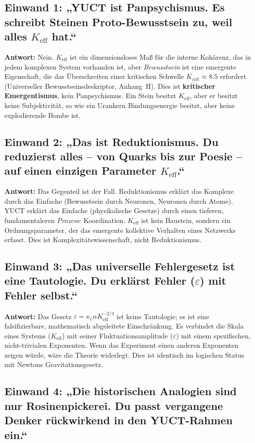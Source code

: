 \documentclass[12pt,a4paper]{article}
\newcommand{\Keff}{K_{\mathrm{eff}}}
\begin{document}
\subsection*{Einwand 1: „YUCT ist Panpsychismus. Es schreibt Steinen Proto-Bewusstsein zu, weil alles \(\Keff\) hat.“}

\textbf{Antwort:} Nein. \(\Keff\) ist ein dimensionsloses Maß für die interne Kohärenz, das in jedem komplexen System vorhanden ist, aber \emph{Bewusstsein} ist eine emergente Eigenschaft, die das Überschreiten einer kritischen Schwelle \(K_{\mathrm{crit}} \approx 8.5\) erfordert (Universeller Bewusstseinsdeskriptor, Anhang~H). Dies ist \textbf{kritischer Emergentismus}, kein Panpsychismus. Ein Stein besitzt \(\Keff\), aber er besitzt keine Subjektivität, so wie ein Urankern Bindungsenergie besitzt, aber keine explodierende Bombe ist.

\subsection*{Einwand 2: „Das ist Reduktionismus. Du reduzierst alles – von Quarks bis zur Poesie – auf einen einzigen Parameter \(\Keff\).“}

\textbf{Antwort:} Das Gegenteil ist der Fall. Reduktionismus erklärt das Komplexe durch das Einfache (Bewusstsein durch Neuronen, Neuronen durch Atome). YUCT erklärt das Einfache (physikalische Gesetze) durch einen tieferen, fundamentaleren \emph{Prozess}: Koordination. \(\Keff\) ist kein Baustein, sondern ein Ordnungsparameter, der das emergente kollektive Verhalten eines Netzwerks erfasst. Dies ist Komplexitätswissenschaft, nicht Reduktionismus.

\subsection*{Einwand 3: „Das universelle Fehlergesetz ist eine Tautologie. Du erklärst Fehler (\(\varepsilon\)) mit Fehler selbst.“}

\textbf{Antwort:} Das Gesetz \(\varepsilon = \kappa_c \alpha \Keff^{-2/3}\) ist keine Tautologie; es ist eine falsifizierbare, mathematisch abgeleitete Einschränkung. Es verbindet die Skala eines Systems (\(\Keff\)) mit seiner Fluktuationsamplitude (\(\varepsilon\)) mit einem spezifischen, nicht-trivialen Exponenten. Wenn das Experiment einen anderen Exponenten zeigen würde, wäre die Theorie widerlegt. Dies ist identisch im logischen Status mit Newtons Gravitationsgesetz.

\subsection*{Einwand 4: „Die historischen Analogien sind nur Rosinenpickerei. Du passt vergangene Denker rückwirkend in den YUCT-Rahmen ein.“}
\end{document}
